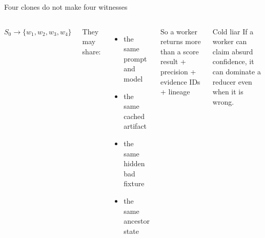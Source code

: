 \begin{frame}{Four clones do not make four witnesses}
\begin{columns}[T,onlytextwidth]
\Large
\begin{center}
$S_0 \rightarrow \{w_1,w_2,w_3,w_4\}$
\end{center}

\vspace{0.3em}
\normalsize They may share:
\begin{itemize}
  \item the same prompt and model
  \item the same cached artifact
  \item the same hidden bad fixture
  \item the same ancestor state
\end{itemize}

\begin{block}{So a worker returns more than a score}
\centering
\large result + precision + evidence IDs + lineage
\end{block}

\vspace{0.45em}
\begin{block}{Cold liar}
If a worker can claim absurd confidence, it can dominate a reducer even when it is wrong.
\end{block}
\end{columns}

\vspace{0.55em}
\centering\Large {}
\end{frame}

